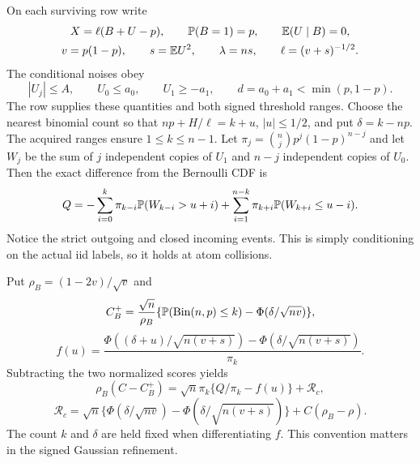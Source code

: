 On each surviving row write
\begin{gather*}
 X=\ell(B+U-p),\qquad \mathbb P(B=1)=p,\qquad \mathbb E(U\mid B)=0,\\
 v=p(1-p),\qquad s=\mathbb E U^2,\qquad\lambda=ns,
 \qquad\ell=(v+s)^{-1/2}.
\end{gather*}
The conditional noises obey
\[
 |U_j|\le A,\qquad U_0\le a_0,\qquad U_1\ge-a_1,
 \qquad d=a_0+a_1<\min(p,1-p).
\]
The row supplies these quantities and both signed threshold ranges.
Choose the nearest binomial count so that
$np+H/\ell=k+u$, $|u|\le1/2$, and put $\delta=k-np$.
The acquired ranges ensure $1\le k\le n-1$.
Let $\pi_j=\binom njp^j(1-p)^{n-j}$ and let $W_j$ be the sum of
$j$ independent copies of $U_1$ and $n-j$ independent copies of $U_0$.
Then the exact difference from the Bernoulli CDF is
\begin{equation}\label{ext:local-count-identity}
 Q=-\sum_{i=0}^k\pi_{k-i}\mathbb P(W_{k-i}>u+i)
       +\sum_{i=1}^{n-k}\pi_{k+i}\mathbb P(W_{k+i}\le u-i).
\end{equation}
Notice the strict outgoing and closed incoming events. This is simply
conditioning on the actual iid labels, so it holds at atom collisions.

Put $\rho_B=(1-2v)/\sqrt v$ and
\[
 C_B^+=\frac{\sqrt n}{\rho_B}
       \{\mathbb P(\operatorname{Bin}(n,p)\le k)-\Phi(\delta/\sqrt{nv})\},
\]
\[
 f(u)=\frac{\Phi((\delta+u)/\sqrt{n(v+s)})
                  -\Phi(\delta/\sqrt{n(v+s)})}{\pi_k}.
\]
Subtracting the two normalized scores yields
\begin{equation}\label{ext:comparison-master}
 \rho_B(C-C_B^+)=\sqrt n\pi_k\{Q/\pi_k-f(u)\}+\mathcal R_c,
\end{equation}
\[
 \mathcal R_c=\sqrt n\{\Phi(\delta/\sqrt{nv})
                   -\Phi(\delta/\sqrt{n(v+s)})\}+C(\rho_B-\rho).
\]
The count $k$ and $\delta$ are held fixed when differentiating $f$.
This convention matters in the signed Gaussian refinement.

